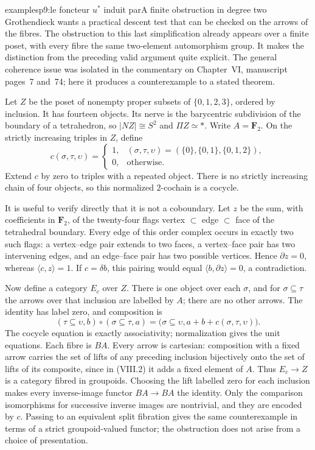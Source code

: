 \begin{dcomment}{examples}{p9:le foncteur $u^*$ induit par}{A finite obstruction in degree two}
Grothendieck wants a practical descent test that can be checked on the arrows of the fibres. The obstruction to this last simplification already appears over a finite poset, with every fibre the same two-element automorphism group. It makes the distinction from the preceding valid argument quite explicit. The general coherence issue was isolated in the commentary on Chapter~VI, manuscript pages~7 and~74; here it produces a counterexample to a stated theorem.

Let $Z$ be the poset of nonempty proper subsets of $\{0,1,2,3\}$, ordered by inclusion. It has fourteen objects. Its nerve is the barycentric subdivision of the boundary of a tetrahedron, so $|NZ|\cong S^2$ and $\Pi Z\simeq*$. Write $A=\mathbf F_2$. On the strictly increasing triples in $Z$, define
\[
 c(\sigma,\tau,\upsilon)=
 \begin{cases}
 1,&(\sigma,\tau,\upsilon)=(\{0\},\{0,1\},\{0,1,2\}),\\
 0,&\text{otherwise}.
 \end{cases}
\]
Extend $c$ by zero to triples with a repeated object. There is no strictly increasing chain of four objects, so this normalized $2$-cochain is a cocycle.

It is useful to verify directly that it is not a coboundary. Let $z$ be the sum, with coefficients in $\mathbf F_2$, of the twenty-four flags vertex $\subset$ edge $\subset$ face of the tetrahedral boundary. Every edge of this order complex occurs in exactly two such flags: a vertex--edge pair extends to two faces, a vertex--face pair has two intervening edges, and an edge--face pair has two possible vertices. Hence $\partial z=0$, whereas $\langle c,z\rangle=1$. If $c=\delta b$, this pairing would equal $\langle b,\partial z\rangle=0$, a contradiction.

Now define a category $E_c$ over $Z$. There is one object over each $\sigma$, and for $\sigma\subseteq\tau$ the arrows over that inclusion are labelled by $A$; there are no other arrows. The identity has label zero, and composition is
\[
 (\tau\subseteq\upsilon,b)\circ(\sigma\subseteq\tau,a)
 =\bigl(\sigma\subseteq\upsilon,
        a+b+c(\sigma,\tau,\upsilon)\bigr).
 \tag{VIII.2}
\]
The cocycle equation is exactly associativity; normalization gives the unit equations. Each fibre is $BA$. Every arrow is cartesian: composition with a fixed arrow carries the set of lifts of any preceding inclusion bijectively onto the set of lifts of its composite, since in (VIII.2) it adds a fixed element of $A$. Thus $E_c\to Z$ is a category fibred in groupoids. Choosing the lift labelled zero for each inclusion makes every inverse-image functor $BA\to BA$ the identity. Only the comparison isomorphisms for successive inverse images are nontrivial, and they are encoded by $c$. Passing to an equivalent split fibration gives the same counterexample in terms of a strict groupoid-valued functor; the obstruction does not arise from a choice of presentation.


\end{dcomment}
